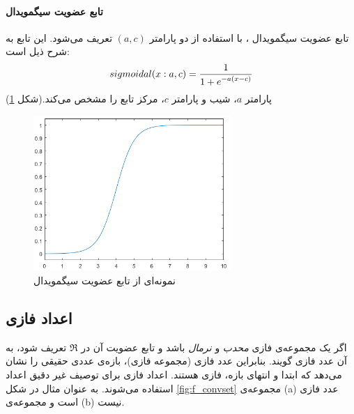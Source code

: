 \documentclass[12pt,a4paper]{article}
\theoremstyle{definition}
\begin{document}
\paragraph{تابع عضویت سیگمویدال}
تابع عضویت سیگمویدال
،
با استفاده از دو پارامتر $(a, c)$ تعریف می‌شود. این تابع به شرح ذیل است:
\begin{equation}\label{eq:e_fset_memfunc_sigmoidal}
sigmoidal (x: a, c) = \frac{1}{1+\mathlarger{e^{-a(x-c)}}} 
	\end{equation}
	پارامتر $a$، شیب و پارامتر $c$، مرکز تابع را مشخص می‌کند.(شکل \ref{fig:f_18})
\cite{yen1999fuzzy}
	\begin{figure}[h]
		\centering 
		\includegraphics[width=75mm]{Images/Fig18.png}
		\vspace{-0.5cm}
		\caption{نمونه‌ای از تابع عضویت سیگمویدال}\label{fig:f_18}
	\end{figure}
 \subsection{‌اعداد فازی} 
 اگر یک مجموعه‌ی فازی \textit{محدب} و \textit{نرمال} باشد و تابع عضویت آن در 
 $\Re$
 تعریف شود، به آن عدد فازی گویند. بنابراین عدد فازی (مجموعه فازی)، بازه‌ی عددی حقیقی را نشان می‌دهد که ابتدا و انتهای بازه، فازی هستند.
 \cite{Lee2005}
  اعداد فازی برای توصیف غیر دقیق اعداد استفاده می‌شوند. 
  به عنوان مثال در شکل 
 \ref{fig:f_convset}
 مجموعه‌ی (a) عدد فازی است و مجموعه‌ی (b) نیست.
\end{document}
